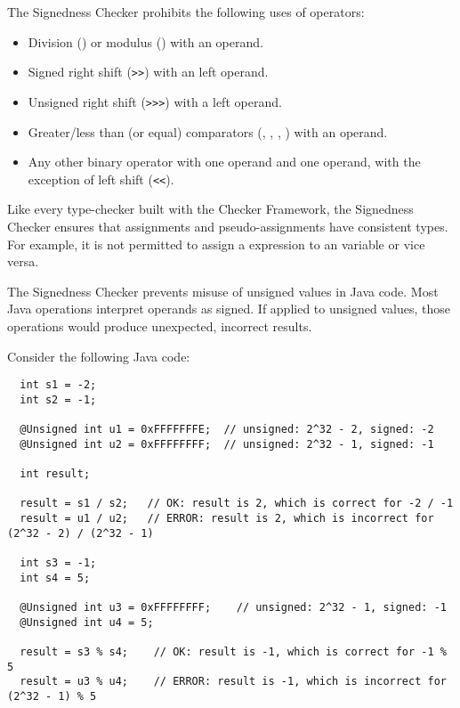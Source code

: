 
The Signedness Checker prohibits the following uses of operators:

\begin{itemize}

    \item
    Division (\code{/}) or modulus (\code{\%}) with an 
    operand.
    \item
    Signed right shift (\verb|>>|) with an  left operand.
    \item
    Unsigned right shift (\verb|>>>|) with a  left operand.
    \item
    Greater/less than (or equal) comparators
    (\code{<}, \code{<=}, \code{>}, \code{>=}) with an 
    operand.
    \item
    Any other binary operator with one  operand and one
     operand, with the exception of left shift (\verb|<<|).

\end{itemize}

Like every type-checker built with the Checker Framework, the Signedness
Checker ensures that assignments and pseudo-assignments have consistent types.
For example, it is not permitted to assign a  expression to an
 variable or vice versa.



The Signedness Checker prevents misuse of unsigned values in Java code.
Most Java operations interpret operands as signed.  If applied to unsigned
values, those operations would produce unexpected, incorrect results.

Consider the following Java code:

\begin{Verbatim}
  int s1 = -2;
  int s2 = -1;

  @Unsigned int u1 = 0xFFFFFFFE;  // unsigned: 2^32 - 2, signed: -2
  @Unsigned int u2 = 0xFFFFFFFF;  // unsigned: 2^32 - 1, signed: -1

  int result;

  result = s1 / s2;   // OK: result is 2, which is correct for -2 / -1
  result = u1 / u2;   // ERROR: result is 2, which is incorrect for (2^32 - 2) / (2^32 - 1)

  int s3 = -1;
  int s4 = 5;

  @Unsigned int u3 = 0xFFFFFFFF;    // unsigned: 2^32 - 1, signed: -1
  @Unsigned int u4 = 5;

  result = s3 % s4;    // OK: result is -1, which is correct for -1 % 5
  result = u3 % u4;    // ERROR: result is -1, which is incorrect for (2^32 - 1) % 5
\end{Verbatim}


